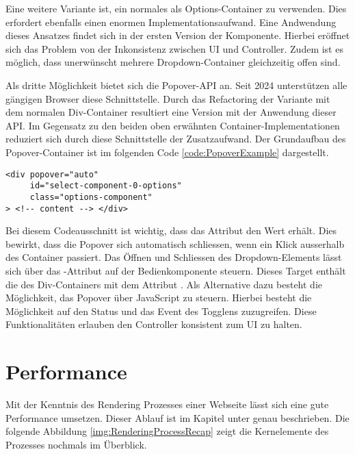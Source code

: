 Eine weitere Variante ist, ein normales  als Options-Container zu verwenden.
Dies erfordert ebenfalls einen enormen Implementationsaufwand.
Eine Andwendung dieses Ansatzes findet sich in der ersten Version der Komponente.
Hierbei eröffnet sich das Problem von der Inkonsistenz zwischen UI und Controller.
Zudem ist es möglich, dass unerwünscht mehrere Dropdown-Container gleichzeitig offen sind.

Als dritte Möglichkeit bietet sich die Popover-API an. 
Seit 2024 unterstützen alle gängigen Browser diese Schnittstelle.
Durch das Refactoring der Variante mit dem normalen Div-Container resultiert eine Version mit der Anwendung dieser API. 
Im Gegensatz zu den beiden oben erwähnten Container-Implementationen reduziert sich durch diese Schnittstelle der Zusatzaufwand. 
Der Grundaufbau des Popover-Container ist im folgenden Code \ref{code:PopoverExample} dargestellt. 

\begin{lstlisting}[style = htmlcssjs, caption = Popover-Container Beispiel, label = code:PopoverExample]
<div popover="auto"
     id="select-component-0-options" 
     class="options-component" 
> <!-- content --> </div>
\end{lstlisting}

Bei diesem Codeausschnitt ist wichtig, dass das Attribut  den Wert  erhält.
Dies bewirkt, dass die Popover sich automatisch schliessen, wenn ein Klick ausserhalb des Container passiert.
Das Öffnen und Schliessen des Dropdown-Elements lässt sich über das -Attribut auf der Bedienkomponente steuern.
Dieses Target enthält die  des Div-Containers mit dem Attribut . 
Als Alternative dazu besteht die Möglichkeit, das Popover über JavaScript zu steuern.
Hierbei besteht die Möglichkeit auf den Status und das Event des Togglens zuzugreifen.
Diese Funktionalitäten erlauben den Controller konsistent zum UI zu halten.


\section{Performance}
\label{sec:performance}

Mit der Kenntnis des Rendering Prozesses einer Webseite lässt sich eine gute Performance umsetzen. 
Dieser Ablauf ist im Kapitel \textbf{} unter \textbf{} genau beschrieben.
Die folgende Abbildung \ref{img:RenderingProcessRecap} zeigt die Kernelemente des Prozesses nochmals im Überblick.

